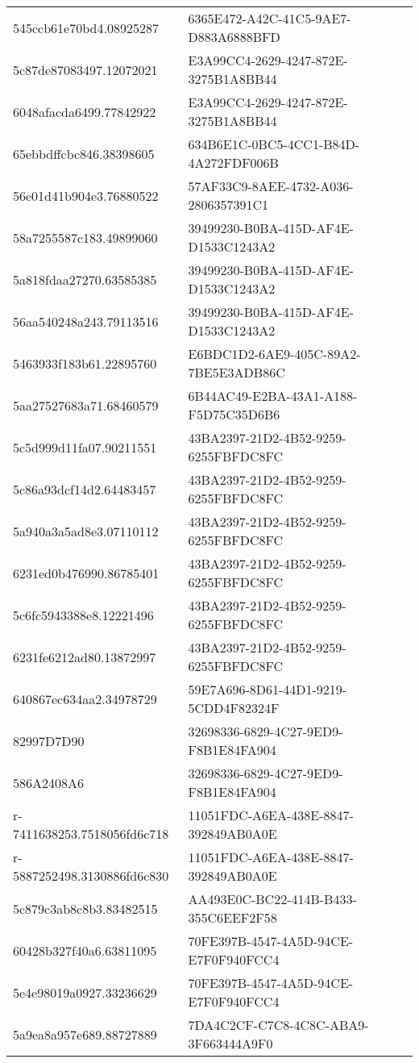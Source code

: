 \begin{tabular}{ll}
545ccb61e70bd4.08925287 & 6365E472-A42C-41C5-9AE7-D883A6888BFD \\
5c87de87083497.12072021 & E3A99CC4-2629-4247-872E-3275B1A8BB44 \\
6048afacda6499.77842922 & E3A99CC4-2629-4247-872E-3275B1A8BB44 \\
65ebbdffcbc846.38398605 & 634B6E1C-0BC5-4CC1-B84D-4A272FDF006B \\
56e01d41b904e3.76880522 & 57AF33C9-8AEE-4732-A036-2806357391C1 \\
58a7255587c183.49899060 & 39499230-B0BA-415D-AF4E-D1533C1243A2 \\
5a818fdaa27270.63585385 & 39499230-B0BA-415D-AF4E-D1533C1243A2 \\
56aa540248a243.79113516 & 39499230-B0BA-415D-AF4E-D1533C1243A2 \\
5463933f183b61.22895760 & E6BDC1D2-6AE9-405C-89A2-7BE5E3ADB86C \\
5aa27527683a71.68460579 & 6B44AC49-E2BA-43A1-A188-F5D75C35D6B6 \\
5c5d999d11fa07.90211551 & 43BA2397-21D2-4B52-9259-6255FBFDC8FC \\
5c86a93dcf14d2.64483457 & 43BA2397-21D2-4B52-9259-6255FBFDC8FC \\
5a940a3a5ad8e3.07110112 & 43BA2397-21D2-4B52-9259-6255FBFDC8FC \\
6231ed0b476990.86785401 & 43BA2397-21D2-4B52-9259-6255FBFDC8FC \\
5c6fc5943388e8.12221496 & 43BA2397-21D2-4B52-9259-6255FBFDC8FC \\
6231fe6212ad80.13872997 & 43BA2397-21D2-4B52-9259-6255FBFDC8FC \\
640867ec634aa2.34978729 & 59E7A696-8D61-44D1-9219-5CDD4F82324F \\
82997D7D90 & 32698336-6829-4C27-9ED9-F8B1E84FA904 \\
586A2408A6 & 32698336-6829-4C27-9ED9-F8B1E84FA904 \\
r-7411638253.7518056fd6c718 & 11051FDC-A6EA-438E-8847-392849AB0A0E \\
r-5887252498.3130886fd6c830 & 11051FDC-A6EA-438E-8847-392849AB0A0E \\
5c879c3ab8c8b3.83482515 & AA493E0C-BC22-414B-B433-355C6EEF2F58 \\
60428b327f40a6.63811095 & 70FE397B-4547-4A5D-94CE-E7F0F940FCC4 \\
5e4e98019a0927.33236629 & 70FE397B-4547-4A5D-94CE-E7F0F940FCC4 \\
5a9ea8a957e689.88727889 & 7DA4C2CF-C7C8-4C8C-ABA9-3F663444A9F0 \\

\end{tabular}
